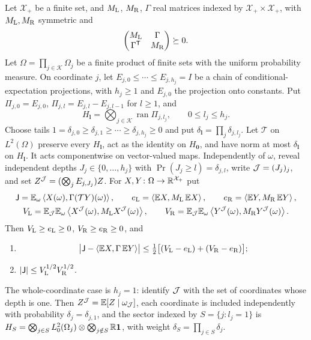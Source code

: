 \begin{lemma}
\label{lem:record:common-mean}
Let $\mathcal X_+$ be a finite set, and $M_{\rm L}$, $M_{\rm R}$, $\Gamma$ real
matrices indexed by $\mathcal X_+\times\mathcal X_+$, with $M_{\rm L},M_{\rm R}$
symmetric and
\begin{equation}\label{eq:record:joint-gram}
 \begin{pmatrix}M_{\rm L}&\Gamma\\ \Gamma^{\mathsf T}&M_{\rm R}\end{pmatrix}
 \succeq0 .
\end{equation}
Let $\Omega=\prod_{j\in\mathcal K}\Omega_j$ be a finite product of finite sets
with the uniform probability measure. On coordinate $j$, let
$E_{j,0}\le\cdots\le E_{j,h_j}=I$ be a chain of conditional-expectation
projections, with $h_j\ge1$ and $E_{j,0}$ the projection onto constants. Put
$\Pi_{j,0}=E_{j,0}$, $\Pi_{j,l}=E_{j,l}-E_{j,l-1}$ for $l\ge1$, and
\[
 H_{\boldsymbol l}=\bigotimes_{j\in\mathcal K}\operatorname{ran}\Pi_{j,l_j},
 \qquad 0\le l_j\le h_j.
\]
Choose tails $1=\delta_{j,0}\ge\delta_{j,1}\ge\cdots\ge\delta_{j,h_j}\ge0$
and put $\delta_{\boldsymbol l}=\prod_j\delta_{j,l_j}$. Let $\mathcal T$ on
$L^2(\Omega)$ preserve every $H_{\boldsymbol l}$, act as the identity on
$H_{\boldsymbol0}$, and have norm at most $\delta_{\boldsymbol l}$ on
$H_{\boldsymbol l}$. It acts componentwise on vector-valued maps.
Independently of $\omega$, reveal independent depths $J_j\in\{0,\ldots,h_j\}$
with $\Pr(J_j\ge l)=\delta_{j,l}$, write
$\mathcal J=(J_j)_j$, and set $Z^\mathcal J=(\bigotimes_jE_{j,J_j})Z$.
For $X,Y\colon\Omega\to\mathbb R^{\mathcal X_+}$ put
\begin{gather*}
 \mathsf J=\mathbb E_\omega\left\langle X(\omega),\Gamma(\mathcal TY)(\omega)\right\rangle,\qquad
 e_{\rm L}=\left\langle \mathbb E X,M_{\rm L}\,\mathbb E X\right\rangle,\qquad
 e_{\rm R}=\left\langle \mathbb E Y,M_{\rm R}\,\mathbb E Y\right\rangle,\\
 V_{\rm L}=\mathbb E_\mathcal J\mathbb E_\omega\left\langle X^\mathcal J(\omega),M_{\rm L}X^\mathcal J(\omega)\right\rangle,\qquad
 V_{\rm R}=\mathbb E_\mathcal J\mathbb E_\omega\left\langle Y^\mathcal J(\omega),M_{\rm R}Y^\mathcal J(\omega)\right\rangle .
\end{gather*}
Then $V_{\rm L}\ge e_{\rm L}\ge0$, $V_{\rm R}\ge e_{\rm R}\ge0$, and
\begin{enumerate}[label=(\alph*)]
\item
 \begin{equation}\label{eq:record:common-mean}
  \bigl|\mathsf J-\left\langle \mathbb E X,\Gamma\,\mathbb E Y\right\rangle\bigr|
  \le\tfrac12\bigl[(V_{\rm L}-e_{\rm L})+(V_{\rm R}-e_{\rm R})\bigr];
 \end{equation}
\item $|\mathsf J|\le V_{\rm L}^{1/2}V_{\rm R}^{1/2}$.
\end{enumerate}

The whole-coordinate case is $h_j=1$: identify $\mathcal J$ with the set of
coordinates whose depth is one. Then $Z^\mathcal J=\mathbb E[Z\mid\omega_\mathcal J]$, each
coordinate is included independently with probability $\delta_j=\delta_{j,1}$,
and the sector indexed by $S=\{j:l_j=1\}$ is
$H_S=\bigotimes_{j\in S}L^2_0(\Omega_j)\otimes\bigotimes_{j\notin S}\mathbb R\mathbf 1$,
with weight $\delta_S=\prod_{j\in S}\delta_j$.
\end{lemma}

